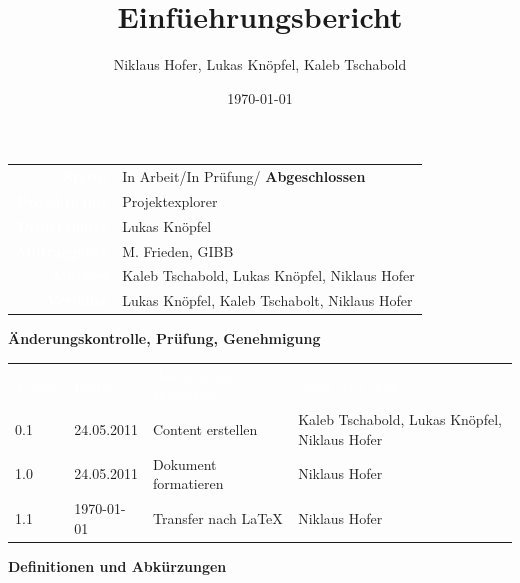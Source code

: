 \documentclass[10pt,paper=a4,final]{scrartcl}
\title{Einf\"uehrungsbericht}
\author{Niklaus Hofer, Lukas Kn\"opfel, Kaleb Tschabold}
\date{\today}
\begin{document}
\maketitle
\newpage
\begin{tabularx}{\textwidth}{ r X }	%
  \textcolor{white}{{\bf Status}}\cellcolor{blue!80!} & In Arbeit/In Prüfung/ {\bf Abgeschlossen}\cellcolor{blue!20!} \\
\textcolor{white}{{\bf Projektname}}\cellcolor{blue!80!} & Projektexplorer\cellcolor{blue!20!} \\
\textcolor{white}{{\bf Projektleiter}}\cellcolor{blue!80!} & Lukas Kn\"opfel\cellcolor{blue!20!} \\
\textcolor{white}{{\bf Auftraggeber}}\cellcolor{blue!80!} & M. Frieden, GIBB\cellcolor{blue!20!} \\
\textcolor{white}{{\bf Autoren}}\cellcolor{blue!80!} & Kaleb Tschabold, Lukas Kn\"opfel, Niklaus Hofer\cellcolor{blue!20!} \\
\textcolor{white}{{\bf Verteiler}}\cellcolor{blue!80!} & Lukas Knöpfel, Kaleb Tschabolt, Niklaus Hofer\cellcolor{blue!20!}
\end{tabularx}
\newline
\newline
\newline
{\bf Änderungskontrolle, Prüfung, Genehmigung}
\newline

\begin{tabularx}{\textwidth}{l l X X}
\textcolor{white}{Version}\cellcolor{blue!80!} & \textcolor{white}{Datum}\cellcolor{blue!80!} & \textcolor{white}{Beschreibung, Bemerkung}\cellcolor{blue!80!} & \textcolor{white}{Name oder Rolle}\cellcolor{blue!80!} \\
\cellcolor{blue!20!} 0.1& \cellcolor{blue!20!} 24.05.2011 & Content erstellen \cellcolor{blue!20!} & Kaleb Tschabold, Lukas Kn\"opfel, Niklaus Hofer \cellcolor{blue!20!} \\
\cellcolor{blue!20!} 1.0& \cellcolor{blue!20!} 24.05.2011 & Dokument formatieren \cellcolor{blue!20!} & Niklaus Hofer \cellcolor{blue!20!} \\
\cellcolor{blue!20!} 1.1& \cellcolor{blue!20!} \today{} & Transfer nach \LaTeX \cellcolor{blue!20!} & Niklaus Hofer \cellcolor{blue!20!} \\
\end{tabularx}
\newline
\newline
\newline
{\bf Definitionen und Abkürzungen}
\newline
\end{document}
